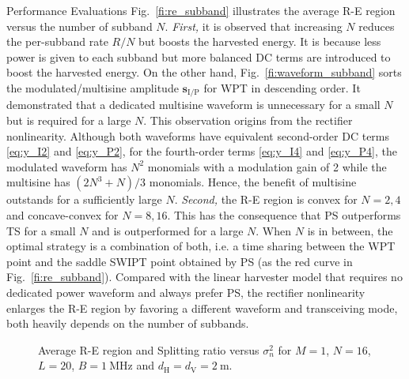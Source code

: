 \documentclass[journal]{IEEEtran}
\begin{document}
\begin{section}{Performance Evaluations}
		Fig.~\ref{fi:re_subband} illustrates the average R-E region versus the number of subband $N$. \textit{First,} it is observed that increasing $N$ reduces the per-subband rate $R/N$ but boosts the harvested energy. It is because less power is given to each subband but more balanced DC terms are introduced to boost the harvested energy. On the other hand, Fig.~\ref{fi:waveform_subband} sorts the modulated/multisine amplitude $\boldsymbol{s}_{\mathrm{I/P}}$ for WPT in descending order. It demonstrated that a dedicated multisine waveform is unnecessary for a small $N$ but is required for a large $N$. This observation origins from the rectifier nonlinearity. Although both waveforms have equivalent second-order DC terms \eqref{eq:y_I2} and \eqref{eq:y_P2}, for the fourth-order terms \eqref{eq:y_I4} and \eqref{eq:y_P4}, the modulated waveform has $N^2$ monomials with a modulation gain of \num{2} while the multisine has $(2N^3+N)/3$ monomials. Hence, the benefit of multisine outstands for a sufficiently large $N$. \textit{Second,} the R-E region is convex for $N=2,4$ and concave-convex for $N=8,16$. This has the consequence that PS outperforms TS for a small $N$ and is outperformed for a large $N$. When $N$ is in between, the optimal strategy is a combination of both, i.e. a time sharing between the WPT point and the saddle SWIPT point obtained by PS (as the red curve in Fig.~\ref{fi:re_subband}). Compared with the linear harvester model that requires no dedicated power waveform and always prefer PS, the rectifier nonlinearity enlarges the R-E region by favoring a different waveform and transceiving mode, both heavily depends on the number of subbands.

		\begin{figure}[!t]
			\centering
			\caption{Average R-E region and Splitting ratio versus $\sigma_n^2$ for $M=1$, $N=16$, $L=20$, $B=\SI{1}{\MHz}$ and $d_{\mathrm{H}}=d_{\mathrm{V}}=\SI{2}{\meter}$.}
		\end{figure}


\end{section}
\end{document}
